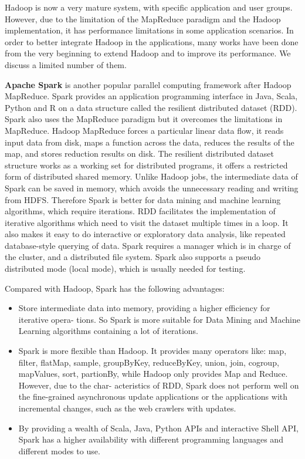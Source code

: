 \documentclass[	DIV=calc,%
							paper=a4,%
							fontsize=11pt,%
							twocolumn]{scrartcl}	 					%
\begin{document}
Hadoop is now a very mature system, with specific application and user groups. However, due to the limitation of the MapReduce paradigm and the Hadoop implementation, it has performance limitations in some application scenarios. In order to better integrate Hadoop in the applications, 
many works have been done from the very beginning to extend Hadoop and to improve its performance. We discuss a limited number of them.


\textbf{Apache Spark} \cite{2} is another popular parallel computing framework after Hadoop MapReduce. Spark provides an application programming interface in Java, Scala, Python and R on a data structure called the resilient distributed dataset (RDD). Spark also uses the MapReduce paradigm but it overcomes the limitations in MapReduce. Hadoop MapReduce forces a particular linear data flow, it reads input data from disk, maps a function across the data, reduces the results of the map, and stores reduction results on disk. The resilient distributed dataset structure works as a working set for distributed programs, it offers a restricted form of distributed shared memory. Unlike Hadoop jobs, the intermediate data of Spark can be saved in memory, which avoids the unnecessary reading and writing from HDFS. Therefore Spark is better for data mining and machine learning algorithms, which require iterations. RDD facilitates the implementation of iterative algorithms which need to visit the dataset multiple times in a loop. It also makes it easy to do interactive or exploratory data analysis, like repeated database-style querying of data.
Spark requires a manager which is in charge of the cluster, and a distributed file system. Spark also supports a pseudo distributed mode (local mode), which is usually needed for testing.

Compared with Hadoop, Spark has the following advantages:

\begin{itemize}

\item Store intermediate data into memory, providing a higher efficiency for iterative opera- tions. So Spark is more suitable for Data Mining and Machine Learning algorithms containing a lot of iterations.

\item Spark is more flexible than Hadoop. It provides many operators like: map, filter, flatMap, sample, groupByKey, reduceByKey, union, join, cogroup, mapValues, sort, partionBy, while Hadoop only provides Map and Reduce. However, due to the char- acteristics of RDD, Spark does not perform well on the fine-grained asynchronous update applications or the applications with incremental changes, such as the web crawlers with updates.

\item By providing a wealth of Scala, Java, Python APIs and interactive Shell API, Spark has a higher availability with different programming languages and different modes to use.

\end{itemize}
\end{document}
